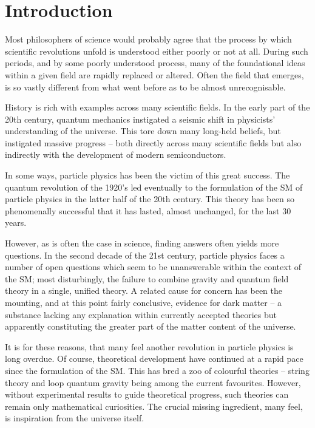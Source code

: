 \chapter*{Introduction}

Most philosophers of science would probably agree that the process by which
scientific revolutions unfold is understood either poorly or not at all. During
such periods, and by some poorly understood process, many of the foundational
ideas within a given field are rapidly replaced or altered. Often the field that
emerges, is so vastly different from what went before as to be almost
unrecognisable.

History is rich with examples across many scientific fields. In the early part
of the 20th century, quantum mechanics instigated a seismic shift in physicists'
understanding of the universe. This tore down many long-held beliefs, but
instigated massive progress -- both directly across many scientific fields but
also indirectly with the development of modern semiconductors.

In some ways, particle physics has been the victim of this great success. The
quantum revolution of the 1920's led eventually to the formulation of the
\ac{SM} of particle physics in the latter half of the 20th century. This theory
has been so phenomenally successful that it has lasted, almost unchanged, for
the last 30 years.

However, as is often the case in science, finding answers often yields more
questions. In the second decade of the 21st century, particle physics faces a
number of open questions which seem to be unanswerable within the context of the
\ac{SM}; most disturbingly, the failure to combine gravity and quantum field
theory in a single, unified theory. A related cause for concern has been the
mounting, and at this point fairly conclusive, evidence for dark matter -- a
substance lacking any explanation within currently accepted theories but
apparently constituting the greater part of the matter content of the
universe.

It is for these reasons, that many feel another revolution in particle physics
is long overdue. Of course, theoretical development have continued at a rapid
pace since the formulation of the \ac{SM}. This has bred a zoo of colourful
theories -- string theory and loop quantum gravity being among the current
favourites. However, without experimental results to guide theoretical progress,
such theories can remain only mathematical curiosities. The crucial missing
ingredient, many feel, is inspiration from the universe itself.

